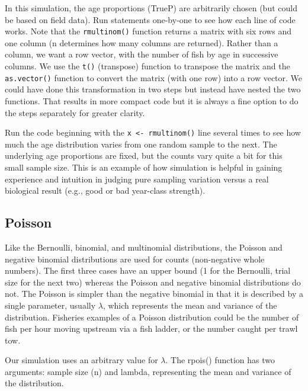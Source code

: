 \documentclass[
]{krantz}
\begin{document}
In this simulation, the age proportions (TrueP) are arbitrarily chosen (but could be based on field data). Run statements one-by-one to see how each line of code works. Note that the \texttt{rmultinom()} function returns a matrix with six rows and one column (n determines how many columns are returned). Rather than a column, we want a row vector, with the number of fish by age in successive columns. We use the \texttt{t()} (transpose) function to transpose the matrix and the \texttt{as.vector()} function to convert the matrix (with one row) into a row vector. We could have done this transformation in two steps but instead have nested the two functions. That results in more compact code but it is always a fine option to do the steps separately for greater clarity.

Run the code beginning with the \texttt{x\ \textless{}-\ rmultinom()} line several times to see how much the age distribution varies from one random sample to the next. The underlying age proportions are fixed, but the counts vary quite a bit for this small sample size. This is an example of how simulation is helpful in gaining experience and intuition in judging pure sampling variation versus a real biological result (e.g., good or bad year-class strength).

\hypertarget{PoissonDist}{%
\subsection{Poisson}\label{PoissonDist}}

Like the Bernoulli, binomial, and multinomial distributions, the Poisson and negative binomial distributions are used for counts (non-negative whole numbers). The first three cases have an upper bound (1 for the Bernoulli, trial size for the next two) whereas the Poisson and negative binomial distributions do not. The Poisson is simpler than the negative binomial in that it is described by a single parameter, usually \(\lambda\), which represents the mean and variance of the distribution. Fisheries examples of a Poisson distribution could be the number of fish per hour moving upstream via a fish ladder, or the number caught per trawl tow.

Our simulation uses an arbitrary value for \(\lambda\). The rpois() function has two arguments: sample size (n) and lambda, representing the mean and variance of the distribution.
\end{document}
